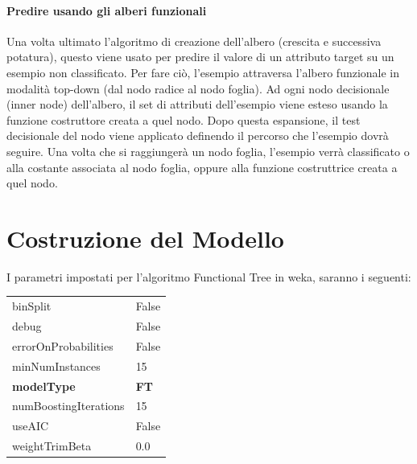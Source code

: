 \paragraph{Predire usando gli alberi funzionali}
Una volta ultimato l'algoritmo di creazione dell'albero (crescita e successiva potatura), questo viene usato per predire il valore di un attributo target su un esempio non classificato. Per fare ciò, l'esempio attraversa l'albero funzionale in modalità top-down (dal nodo radice al nodo foglia). Ad ogni nodo decisionale (inner node) dell'albero, il set di attributi dell'esempio viene esteso usando la funzione costruttore creata a quel nodo. Dopo questa espansione, il test decisionale del nodo viene applicato definendo il percorso che l'esempio dovrà seguire. Una volta che si raggiungerà un nodo foglia, l'esempio verrà classificato o alla costante associata al nodo foglia, oppure alla funzione costruttrice creata a quel nodo.

\section{Costruzione del Modello}
I parametri impostati per l'algoritmo Functional Tree in weka, saranno i seguenti:
\begin{table}[htbp]
	\begin{center}		
	\begin{tabular}{ l | l }
		binSplit & False \\
		debug & False \\
		errorOnProbabilities & False \\
		minNumInstances & 15 \\
		\textbf{modelType} & \textbf{FT} \\
		numBoostingIterations & 15 \\
		useAIC & False \\
		weightTrimBeta & 0.0 \\
	\end{tabular}
	\end{center}
\end{table}

